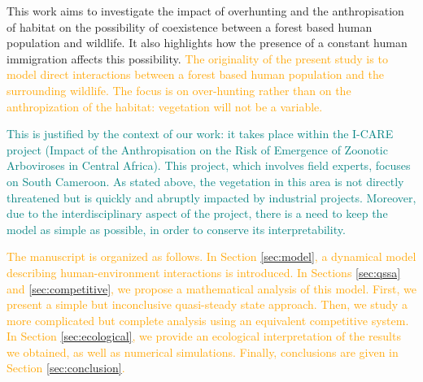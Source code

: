 \documentclass{article}
\newcommand{\vdeux}[1]{\textcolor{orange}{#1}}
\newcommand{\vtrois}[1]{\textcolor{OliveGreen}{#1}}
\newcommand{\vquatre}[1]{\textcolor{teal}{#1}}
\theoremstyle{definition}
\theoremstyle{remark}
\begin{document}
\vtrois{
This work aims to investigate the impact of overhunting and the anthropisation of habitat on the possibility of coexistence between a forest based human population and wildlife. It also highlights how the presence of a constant human immigration affects this possibility.
} 
\vdeux{
The originality of the present study is to model direct interactions between a forest based human population and the surrounding wildlife. The focus is on over-hunting rather than on the anthropization of the habitat: vegetation will not be a variable.}


\vquatre{
This is justified by the context of our work: it takes place within the I-CARE project (Impact of the Anthropisation on the Risk of Emergence of Zoonotic Arboviroses in Central Africa). This project, which involves field experts, focuses on South Cameroon. As stated above, the vegetation in this area is not directly threatened but is quickly and abruptly impacted by industrial projects. Moreover, due to the interdisciplinary aspect of the project, there is a need to keep the model as simple as possible, in order to conserve its interpretability. 
}


\vdeux{
The manuscript is organized as follows. In Section \ref{sec:model}, a dynamical model describing human-environment interactions is \vtrois{introduced}. In Sections \ref{sec:qssa} and \ref{sec:competitive}, we propose a mathematical analysis of this model. First, we present a simple but inconclusive quasi-steady state approach. Then, we \vtrois{study} a more complicated but complete analysis using an equivalent competitive system. In Section \ref{sec:ecological}, we provide an ecological interpretation of the results we obtained, as well as numerical simulations. Finally, conclusions are given in Section \ref{sec:conclusion}.
}
\end{document}
